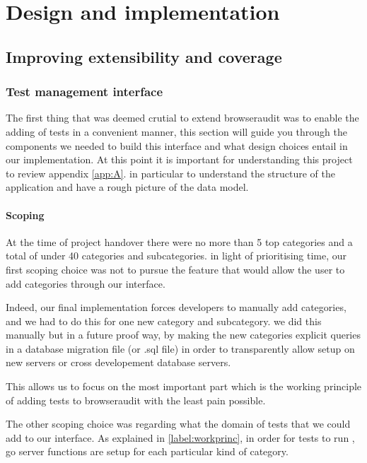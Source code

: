 \chapter{Design and implementation}

\section{Improving extensibility and coverage}
\label{label:addtest}

\subsection{Test management interface}

The first thing that was deemed crutial to extend browseraudit was to enable the adding of tests in a convenient manner, this section will
guide you through the components we needed to build this interface and what design choices entail in our implementation.
At this point it is important for understanding this project to review appendix \ref{app:A}. in particular to understand
the structure of the application and have a rough picture of the data model. 

\subsubsection{Scoping}

At the time of project handover there were no more than 5 top categories and a total of under 40 categories and subcategories.
in light of prioritising time, our first scoping choice was not to pursue the feature that would allow the user to add categories through our interface.

Indeed, our final implementation forces developers to manually add categories, and we had to do this for one new category and subcategory.
we did this manually but in a future proof way, by making the new categories explicit queries in a database migration file (or .sql file) in order to transparently allow setup on new
servers or cross developement database servers.

This allows us to focus on the most important part which is the working principle of adding tests to browseraudit with the least pain possible.

The other scoping choice was regarding what the domain of tests that we could add to our interface. As explained in \ref{label:workprinc}, 
in order for tests to run , go server functions are setup for each particular kind of category. 

